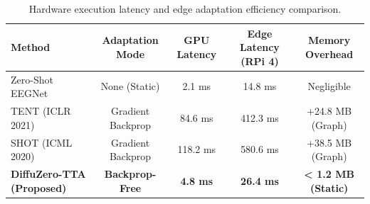 \begin{table}[h]
\centering
\small
\caption{Hardware execution latency and edge adaptation efficiency comparison.}
\label{tab:edge_latency}
\begin{tabular}{lcccc}
\toprule
\textbf{Method} & \textbf{Adaptation Mode} & \textbf{GPU Latency} & \textbf{Edge Latency (RPi 4)} & \textbf{Memory Overhead} \\
\midrule
Zero-Shot EEGNet & None (Static) & 2.1 ms & 14.8 ms & Negligible \\
TENT (ICLR 2021) & Gradient Backprop & 84.6 ms & 412.3 ms & +24.8 MB (Graph) \\
SHOT (ICML 2020) & Gradient Backprop & 118.2 ms & 580.6 ms & +38.5 MB (Graph) \\
\midrule
\textbf{DiffuZero-TTA (Proposed)} & \textbf{Backprop-Free} & \textbf{4.8 ms} & \textbf{26.4 ms} & \textbf{< 1.2 MB (Static)} \\
\bottomrule
\end{tabular}
\end{table}
